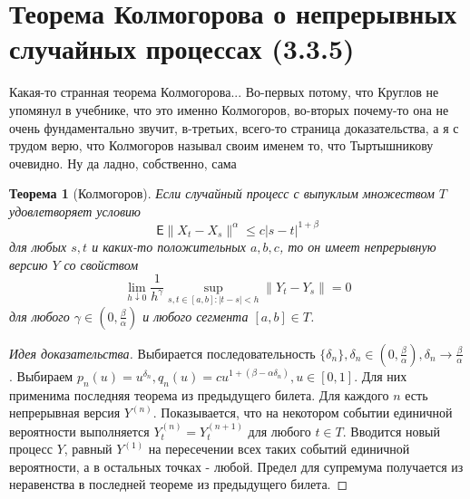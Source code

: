 \documentclass[16pt]{article}
\newtheorem{theorem}{Теорема}[section]
\theoremstyle{definition}
\begin{document}
\section{Теорема Колмогорова о непрерывных случайных процессах (3.3.5)}
Какая-то странная теорема Колмогорова... Во-первых потому, что Круглов не упомянул в учебнике, что это именно Колмогоров, во-вторых почему-то она не очень фундаментально звучит, в-третьих, всего-то страница доказательства, а я с трудом верю, что Колмогоров называл своим именем то, что Тыртышникову очевидно. Ну да ладно, собственно, сама
\begin{theorem}[Колмогоров]
Если случайный процесс с выпуклым множеством $T$ удовлетворяет условию $$\mathsf{E} \|X_t - X_s\|^\alpha \le c|s - t|^{1 + \beta}$$ для любых $s, t$ и каких-то положительных $a, b, c$, то он имеет непрерывную версию $Y$ со свойством $$\lim_{h \downarrow 0}\frac{1}{h^\gamma}\sup_{s, t \in [a, b]: |t - s| < h} \|Y_t - Y_s\| = 0$$ для любого $\gamma \in (0, \frac{\beta}{\alpha})$ и любого сегмента $[a, b] \in T$.
\end{theorem}
\begin{proof}[Идея доказательства]
Выбирается последовательность $\{\delta_n\}, \delta_n \in (0, \frac{\beta}{\alpha}), \delta_n \rightarrow \frac{\beta}{\alpha}$. Выбираем $p_n(u) = u^{\delta_n}, q_n(u) = cu^{1 + (\beta - \alpha\delta_n)}, u \in [0, 1]$. Для них применима последняя теорема из предыдущего билета. Для каждого $n$ есть непрерывная версия $Y^{(n)}$. Показывается, что на некотором событии единичной вероятности выполняется $Y_t^{(n)} = Y_t^{(n + 1)}$ для любого $t \in T$. Вводится новый процесс $Y$, равный $Y^{(1)}$ на пересечении всех таких событий единичной вероятности, а в остальных точках - любой. Предел для супремума получается из неравенства в последней теореме из предыдущего билета.
\end{proof}
\end{document}
